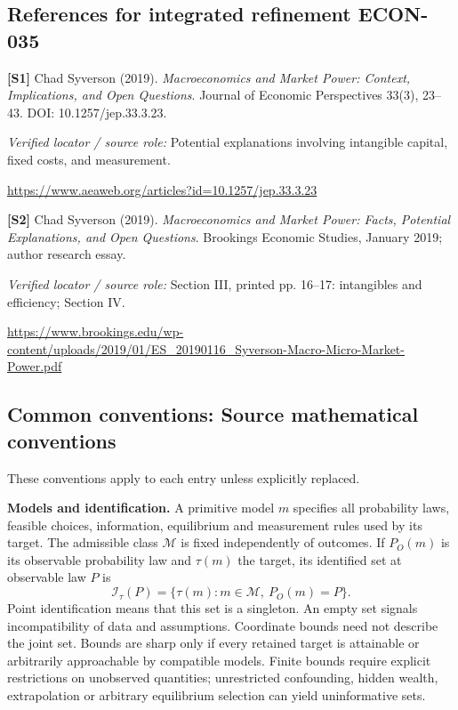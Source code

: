 \documentclass[11pt,a4paper]{article}
\begin{document}
\subsection*{References for integrated refinement ECON-035}
{\footnotesize\raggedright
\par\noindent\textbf{[S1]} Chad Syverson (2019). \emph{Macroeconomics and Market Power: Context, Implications, and Open Questions}. Journal of Economic Perspectives 33(3), 23–43. DOI: 10.1257/jep.33.3.23.\par \textit{Verified locator / source role:} Potential explanations involving intangible capital, fixed costs, and measurement.\par \url{https://www.aeaweb.org/articles?id=10.1257/jep.33.3.23}\par\smallskip
\par\noindent\textbf{[S2]} Chad Syverson (2019). \emph{Macroeconomics and Market Power: Facts, Potential Explanations, and Open Questions}. Brookings Economic Studies, January 2019; author research essay.\par \textit{Verified locator / source role:} Section III, printed pp. 16–17: intangibles and efficiency; Section IV.\par \url{https://www.brookings.edu/wp-content/uploads/2019/01/ES_20190116_Syverson-Macro-Micro-Market-Power.pdf}\par\smallskip
}

\subsection*{Common conventions: Source mathematical conventions}

These conventions apply to each entry unless explicitly replaced.

\textbf{Models and identification.} A primitive model \(m\) specifies all probability laws, feasible choices, information, equilibrium and measurement rules used by its target. The admissible class \(\mathcal M\) is fixed independently of outcomes. If \(P_O(m)\) is its observable probability law and \(\tau(m)\) the target, its identified set at observable law \(P\) is
\[
 \mathcal I_\tau(P)=\{\tau(m):m\in\mathcal M,\ P_O(m)=P\}.
\]
Point identification means that this set is a singleton. An empty set signals incompatibility of data and assumptions. Coordinate bounds need not describe the joint set. Bounds are sharp only if every retained target is attainable or arbitrarily approachable by compatible models. Finite bounds require explicit restrictions on unobserved quantities; unrestricted confounding, hidden wealth, extrapolation or arbitrary equilibrium selection can yield uninformative sets.
\end{document}
